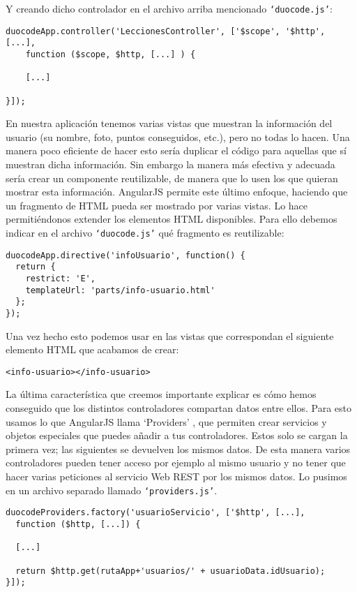 Y creando dicho controlador en el archivo arriba mencionado \texttt{`duocode.js'}:

{\codesize
\lstset{}
\begin{lstlisting}[frame=single]
duocodeApp.controller('LeccionesController', ['$scope', '$http', [...], 
    function ($scope, $http, [...] ) {
    
	[...] 

}]);
\end{lstlisting}
}

En nuestra aplicación tenemos varias vistas que muestran la información del usuario (su nombre, foto, puntos conseguidos, etc.), pero no todas lo hacen. Una manera poco eficiente de hacer esto sería duplicar el código para aquellas que sí muestran dicha información. Sin embargo la manera más efectiva y adecuada sería crear un componente reutilizable, de manera que lo usen los que quieran mostrar esta información. AngularJS permite este último enfoque, haciendo que un fragmento de HTML pueda ser mostrado por varias vistas. Lo hace permitiéndonos extender los elementos HTML disponibles. Para ello debemos indicar en el archivo \texttt{`duocode.js'} qué fragmento es reutilizable: 

{\codesize
\lstset{}
\begin{lstlisting}[frame=single]
duocodeApp.directive('infoUsuario', function() {
  return {
    restrict: 'E',
    templateUrl: 'parts/info-usuario.html'
  };
});
\end{lstlisting}
}

Una vez hecho esto podemos usar en las vistas que correspondan el siguiente elemento HTML que acabamos de crear:

{\codesize
\begin{verbatim}
<info-usuario></info-usuario>
\end{verbatim}
}

La última característica que creemos importante explicar es cómo hemos conseguido que los distintos controladores compartan datos entre ellos. Para esto usamos lo que AngularJS llama `Providers' \cite{providers}, que permiten crear servicios y objetos especiales que puedes añadir a tus controladores. Estos solo se cargan la primera vez; las siguientes se devuelven los mismos datos. De esta manera varios controladores pueden tener acceso por ejemplo al mismo usuario y no tener que hacer varias peticiones al servicio Web REST por los mismos datos. Lo pusimos en un archivo separado llamado \texttt{`providers.js'}.

{\codesize
\lstset{}
\begin{lstlisting}[frame=single]
duocodeProviders.factory('usuarioServicio', ['$http', [...], 
  function ($http, [...]) {

  [...]
  
  return $http.get(rutaApp+'usuarios/' + usuarioData.idUsuario);
}]);
\end{lstlisting}
}

